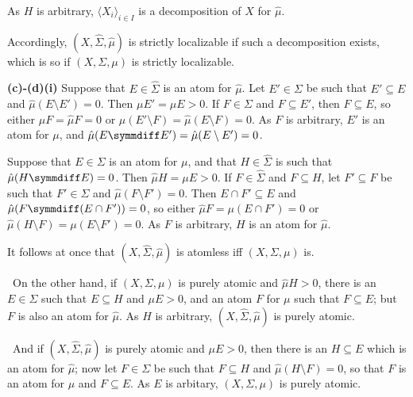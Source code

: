 {\noindent As $H$ is arbitrary, $\langle X_i\rangle_{i\in I}$
is a decomposition of $X$ for $\hat\mu$.

Accordingly, $(X,\hat\Sigma,\hat\mu)$ is strictly localizable if such a
decomposition exists, which is so if $(X,\Sigma,\mu)$ is strictly
localizable.

\medskip

{\bf (c)-(d)(i)} Suppose that $E\in\hat\Sigma$ is an atom for $\hat\mu$.
Let $E'\in\Sigma$ be such that $E'\subseteq E$ and
$\hat\mu(E\setminus E')=0$.   Then $\mu E'=\hat\mu E>0$.   If $F\in\Sigma$ and $F\subseteq E'$, then $F\subseteq E$, so either
$\mu F=\hat\mu F=0$ or $\mu(E'\setminus F)=\hat\mu(E\setminus F)=0$.   As
$F$ is arbitrary, $E'$ is an atom for $\mu$, and
$\hat\mu(E\symmdiff E')=\hat\mu(E\setminus E')=0$.

\medskip

 Suppose that $E\in\Sigma$ is an atom for $\mu$, and that
$H\in\hat\Sigma$ is such that $\hat\mu(H\symmdiff E)=0$.   Then
$\hat\mu H=\mu E>0$.   If $F\in\hat\Sigma$ and $F\subseteq H$, let
$F'\subseteq F$ be such that $F'\in\Sigma$ and
$\hat\mu(F\setminus F')=0$.   Then
$E\cap F'\subseteq E$ and $\hat\mu(F\symmdiff(E\cap F'))=0$, so either
$\hat\mu F=\mu(E\cap F')=0$ or
$\hat\mu(H\setminus F)=\mu(E\setminus F')=0$.   As $F$ is arbitrary, $H$
is an atom for $\hat\mu$.

\medskip

 It follows at once that $(X,\hat\Sigma,\hat\mu)$ is
atomless iff $(X,\Sigma,\mu)$ is.

\medskip

\grheada\ On the other hand, if $(X,\Sigma,\mu)$
is purely atomic and $\hat\mu H>0$, there is an $E\in\Sigma$ such that
$E\subseteq H$ and $\mu E>0$, and an atom $F$ for $\mu$ such that
$F\subseteq E$;  but $F$ is also an atom for $\hat\mu$.   As $H$ is
arbitrary, $(X,\hat\Sigma,\hat\mu)$ is purely atomic.

\medskip

\qquad\grheadb\ And if $(X,\hat\Sigma,\hat\mu)$ is purely
atomic and $\mu E>0$, then there is an $H\subseteq E$ which is an atom
for
$\hat\mu$;  now let $F\in\Sigma$ be such that $F\subseteq H$ and
$\hat\mu(H\setminus F)=0$, so that $F$ is an atom for $\mu$ and
$F\subseteq E$.   As $E$ is arbitary, $(X,\Sigma,\mu)$ is purely atomic.
}%

